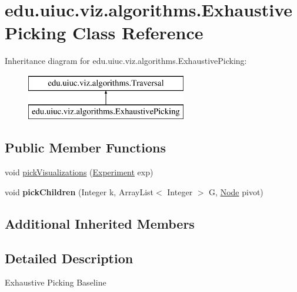 \hypertarget{classedu_1_1uiuc_1_1viz_1_1algorithms_1_1_exhaustive_picking}{}\section{edu.\+uiuc.\+viz.\+algorithms.\+Exhaustive\+Picking Class Reference}
\label{classedu_1_1uiuc_1_1viz_1_1algorithms_1_1_exhaustive_picking}
Inheritance diagram for edu.\+uiuc.\+viz.\+algorithms.\+Exhaustive\+Picking\+:\begin{figure}[H]
\begin{center}
\leavevmode
\includegraphics[height=2.000000cm]{classedu_1_1uiuc_1_1viz_1_1algorithms_1_1_exhaustive_picking}
\end{center}
\end{figure}
\subsection*{Public Member Functions}
\begin{DoxyCompactItemize}
\item 
void \mbox{\hyperlink{classedu_1_1uiuc_1_1viz_1_1algorithms_1_1_exhaustive_picking_a03c9781724cd64c0d1294c06b9bb9ceb}{pick\+Visualizations}} (\mbox{\hyperlink{classedu_1_1uiuc_1_1viz_1_1algorithms_1_1_experiment}{Experiment}} exp)
\item 
\mbox{\label{classedu_1_1uiuc_1_1viz_1_1algorithms_1_1_exhaustive_picking_a30a9f324db88e32335d335e219cd04d4}} 
void {\bfseries pick\+Children} (Integer k, Array\+List$<$ Integer $>$ G, \mbox{\hyperlink{classedu_1_1uiuc_1_1viz_1_1lattice_1_1_node}{Node}} pivot)
\end{DoxyCompactItemize}
\subsection*{Additional Inherited Members}


\subsection{Detailed Description}
Exhaustive Picking Baseline


